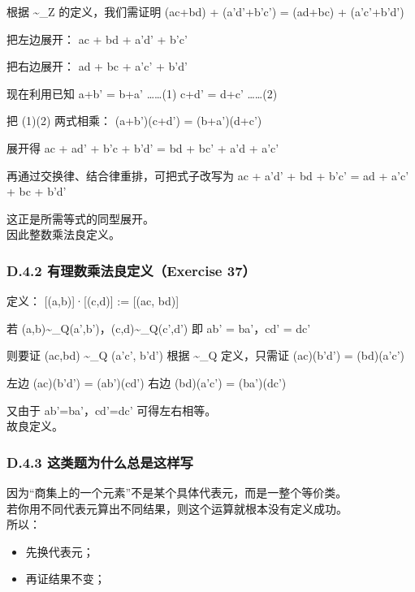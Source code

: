 \documentclass[
  11pt,
]{article}
\providecommand{\tightlist}{%
  \setlength{\itemsep}{0pt}\setlength{\parskip}{0pt}}
\begin{document}
根据 \textasciitilde\_Z 的定义，我们需证明 (ac+bd) + (a'd'+b'c') =
(ad+bc) + (a'c'+b'd')

把左边展开： ac + bd + a'd' + b'c'

把右边展开： ad + bc + a'c' + b'd'

现在利用已知 a+b' = b+a' \ldots\ldots(1) c+d' = d+c' \ldots\ldots(2)

把 (1)(2) 两式相乘： (a+b')(c+d') = (b+a')(d+c')

展开得 ac + ad' + b'c + b'd' = bd + bc' + a'd + a'c'

再通过交换律、结合律重排，可把式子改写为 ac + a'd' + bd + b'c' = ad +
a'c' + bc + b'd'

这正是所需等式的同型展开。\\
因此整数乘法良定义。

\subsubsection{D.4.2 有理数乘法良定义（Exercise
37）}\label{d.4.2-ux6709ux7406ux6570ux4e58ux6cd5ux826fux5b9aux4e49exercise-37}

定义： {[}(a,b){]}·{[}(c,d){]} := {[}(ac, bd){]}

若 (a,b)\textasciitilde\_Q(a',b')，(c,d)\textasciitilde\_Q(c',d') 即 ab'
= ba'，cd' = dc'

则要证 (ac,bd) \textasciitilde\_Q (a'c', b'd') 根据 \textasciitilde\_Q
定义，只需证 (ac)(b'd') = (bd)(a'c')

左边 (ac)(b'd') = (ab')(cd') 右边 (bd)(a'c') = (ba')(dc')

又由于 ab'=ba'，cd'=dc' 可得左右相等。\\
故良定义。

\subsubsection{D.4.3
这类题为什么总是这样写}\label{d.4.3-ux8fd9ux7c7bux9898ux4e3aux4ec0ux4e48ux603bux662fux8fd9ux6837ux5199}

因为``商集上的一个元素''不是某个具体代表元，而是一整个等价类。\\
若你用不同代表元算出不同结果，则这个运算就根本没有定义成功。\\
所以：

\begin{itemize}
\tightlist
\item
  先换代表元；
\item
  再证结果不变；
\end{itemize}
\end{document}

